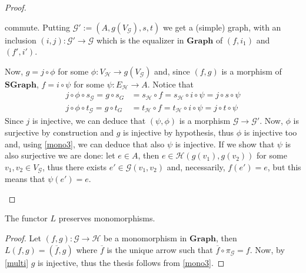 \documentclass[runningheads,envcountsect]{lmcs}
\newcommand{\gr}{\catname{Graph}}
\newcommand{\dgr}{\catname{SGraph}}
\newcommand{\catname}[1]{\mathbf{#1}}
\theoremstyle{plain}
\theoremstyle{definition}
\begin{document}
\begin{proof}
\begin{enumerate}
	\begin{center}
	\end{center}	
	commute. Putting $\mathcal{{G}}':=(A, g(V_\mathcal{{G}}), s, t)$
	we get a (simple) graph, with an inclusion $(i,j):\mathcal{{G}}'\to \mathcal{{G}}$ which is the equalizer in $\gr$ of $(f,i_1)$ and $(f',i')$.
	
Now, $g=j\circ \phi$ for some $\phi: V_\mathcal{{H}}\to g(V_\mathcal{{G}})$ and, since $(f,g)$ is a morphism of $\dgr$,  $f=i\circ \psi$ for some $\psi:E_\mathcal{{H}}\to A$. Notice that
\begin{align*}
j\circ \phi\circ s_\mathcal{{G}}=g\circ s_G&=s_\mathcal{{H}}\circ f=s_\mathcal{{H}}\circ i \circ \psi =j\circ s \circ \psi\\
j\circ \phi\circ t_\mathcal{{G}}=g\circ t_G&=t_\mathcal{{H}}\circ f=t_\mathcal{{H}}\circ i \circ \psi =j\circ t \circ \psi
\end{align*}
Since $j$ is injective, we can deduce that $(\psi, \phi)$ is a morphism $\mathcal{{G}}\to \mathcal{{G}}'$. Now, $\phi$ is surjective by construction and $g$ is injective by hypothesis, thus $\phi$ is injective too and, using \cref{mono3}, we can deduce that also $\psi$ is injective. If we show that $\psi$ is also surjective we are done: let $e\in A$, then $e\in \mathcal{{H}}(g(v_1), g(v_2))$ for some $v_1,v_2\in V_\mathcal{{G}}$, thus there exists $e'\in \mathcal{{G}}(v_1, v_2)$ and, necessarily, $f(e')=e$, but this means that $\psi(e')=e$.
		\qedhere
	\end{enumerate}
\end{proof}


\begin{cor}\label{mono2}
	 The functor $L$ preserves monomorphisms.
\end{cor}
\begin{proof}Let $(f,g):\mathcal{{G}}\to \mathcal{{H}}$ be a monomorphism in $\gr$, then $L(f,g)=(\overline{f}, g)$ where $\overline{f}$ is the unique arrow such that $\overline{f}\circ \pi_\mathcal{{G}}=f$. Now, by \cref{multi} $g$ is injective, thus the thesis follows from \cref{mono3}.
\end{proof}
\end{document}
